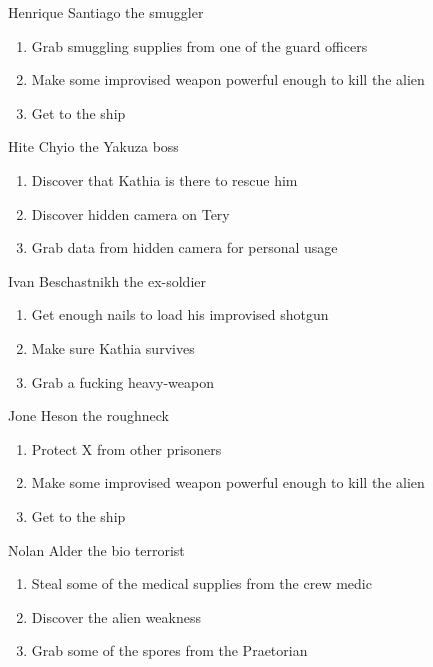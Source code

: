 \begin{rpg-commentbox}{Henrique Santiago the smuggler}
    \begin{enumerate}[label=Act \arabic*]
        \item Grab smuggling supplies from one of the guard officers
        \item Make some improvised weapon powerful enough to kill the alien
        \item Get to the ship
    \end{enumerate}
\end{rpg-commentbox}

\begin{rpg-commentbox}{Hite Chyio the Yakuza boss}
    \begin{enumerate}[label=Act \arabic*]
        \item Discover that Kathia is there to rescue him
        \item Discover hidden camera on Tery
        \item Grab data from hidden camera for personal usage
    \end{enumerate}
    
\end{rpg-commentbox}

\begin{rpg-commentbox}{Ivan Beschastnikh the ex-soldier}
    \begin{enumerate}[label=Act \arabic*]
        \item Get enough nails to load his improvised shotgun
        \item Make sure Kathia survives
        \item Grab a fucking heavy-weapon
    \end{enumerate}
\end{rpg-commentbox}

\begin{rpg-commentbox}{Jone Heson the roughneck}
    \begin{enumerate}[label=Act \arabic*]
        \item Protect X from other prisoners
        \item Make some improvised weapon powerful enough to kill the alien
        \item Get to the ship
    \end{enumerate}
\end{rpg-commentbox}

\begin{rpg-commentbox}{Nolan Alder the  bio terrorist}
    \begin{enumerate}[label=Act \arabic*]
        \item Steal some of the medical supplies from the crew medic
        \item Discover the alien weakness
        \item Grab some of the spores from the Praetorian
    \end{enumerate}
\end{rpg-commentbox}

